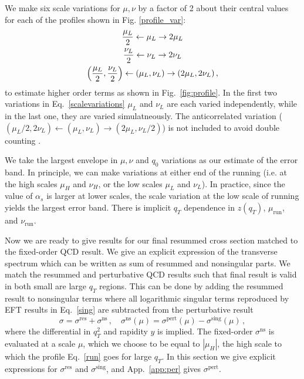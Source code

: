 \documentclass[a4,letterpaper,11pt]{article}
\newcommand{\nn}{\nonumber}
\newcommand{\be}{\begin{equation}}
\newcommand{\ee}{\end{equation}}
\newcommand{\abs}[1]{\left\lvert #1\right\rvert}
\newcommand{\run}{\text{run}}
\newcommand{\mur}{\mu_\run}
\newcommand{\nur}{\nu_\run}
\newcommand{\as}{\alpha_s}
\newcommand{\eq}[1]{Eq.~\eqref{#1}}
\newcommand{\appx}[1]{App.~\ref{app:#1}}
\newcommand{\fig}[1]{Fig.~\ref{fig:#1}}
\begin{document}
We make six scale variations for $\mu, \nu$ by a factor of 2 about their central values for each of the profiles shown in Fig. \ref{profile_var}:
\begin{gather}
\frac{\mu_L}{2} \leftarrow \mu_L \rightarrow 2\mu_L \nn \\
\frac{\nu_L}{2} \leftarrow \nu_L\rightarrow 2\nu_L 
\label{scalevariations}
\\
\Bigl(\frac{\mu_L}{2}, \frac{\nu_L}{2}\Bigr)\leftarrow  (\mu_L,\nu_L)\rightarrow (2\mu_L, 2\nu_L)\,, \nn
\end{gather}
 to estimate higher order terms as shown in \fig{profile}. In the first two variations in \eq{scalevariations} $\mu_L$ and $\nu_L$ are each varied independently, while in the last one, they are varied simulatneously. The anticorrelated variation ($(\mu_L/2, 2\nu_L)\leftarrow (\mu_L,\nu_L)\rightarrow ( 2\mu_L, \nu_L/2)$) is not included to avoid double counting \cite{Neill:2015roa}.

We take the largest envelope in $\mu,\nu$ and $q_0$ variations as our estimate of the error band.
In principle, we can make variations at either end of the running (i.e. at the high scales $\mu_H$ and $\nu_H$,
or the low scales $\mu_L$ and $\nu_L$). In practice, since the value of $\as$ is larger at lower scales, the scale
variation at the low scale of running yields the largest error band.
There is implicit $q_T$ dependence in $z(q_T)$, $\mur$, and $\nur$.

Now we are ready to give results for our final resummed cross section matched to the fixed-order QCD result. We give an explicit expression of the transverse spectrum which can be written as sum of resummed and nonsingular parts.
We match the resummed and perturbative QCD results such that final result is valid in both small are large $q_T$ regions.
This can be done by adding the resummed result to nonsingular terms  where
all logarithmic singular terms reproduced by EFT results in \eq{sing} are subtracted from the perturbative result
\be
\sigma = \sigma^\text{res} + \sigma^\text{ns}\,,\quad \sigma^\text{ns}(\mu) = \sigma^\text{pert} (\mu) -\sigma^\text{sing}(\mu)
\,, \label{nsdef}
\ee
where the differential in $q_T^2$ and rapidity $y$ is implied. The fixed-order $\sigma^{\text{ns}}$ is evaluated at a scale $\mu$, which we choose to be equal to $\abs{\mu_H}$, the high scale to which the profile \eq{run} goes for large $q_T$.
In this section we give explicit expressions for  $\sigma^\text{res}$ and  $\sigma^\text{sing}$, and \appx{per} gives $ \sigma^\text{pert}$.
\end{document}
